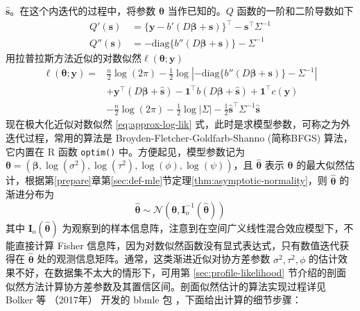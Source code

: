 \documentclass[12pt,a4paper,UTF8,twoside]{book}
\theoremstyle{definition}
\theoremstyle{definition}
\theoremstyle{definition}
\theoremstyle{remark}
\begin{document}
\(\hat{\mathbf{s}}\)。在这个内迭代的过程中，将参数
\(\boldsymbol{\theta}\) 当作已知的。\(Q\) 函数的一阶和二阶导数如下
\begin{align}
Q'(\mathbf{s})& =  \{\mathbf{y} - b'(D\boldsymbol{\beta} + \mathbf{s}) \}^{\top} - \mathbf{s}^{\top}\Sigma^{-1} \label{eq:first-deriv} \\
Q''(\mathbf{s})& =  -\mathrm{diag} \{b''(D\boldsymbol{\beta} + \mathbf{s}) \} - \Sigma^{-1} \label{eq:second-deriv}
\end{align}
\noindent 用拉普拉斯方法近似的对数似然\(\ell(\boldsymbol{\theta};\mathbf{y})\)
\begin{equation}
\begin{aligned}
\ell(\boldsymbol{\theta};\mathbf{y}) = {} & \frac{n}{2}\log (2\pi) -\frac{1}{2}\log | -\mathrm{diag} \{b''(D\boldsymbol{\beta} + \mathbf{s}) \} - \Sigma^{-1} |  \\
& + \mathbf{y}^{\top} (D\boldsymbol{\beta} + \hat{\mathbf{s}}) - \mathbf{1}^{\top} b( D\boldsymbol{\beta} + \hat{\mathbf{s}}) + \mathbf{1}^{\top} c(\mathbf{y}) \\
& - \frac{n}{2}\log (2\pi) -\frac{1}{2}\log |\Sigma| -\frac{1}{2}\hat{\mathbf{s}}^{\top} \Sigma^{-1} \hat{\mathbf{s}}
\end{aligned} \label{eq:approx-log-lik}
\end{equation} \noindent 现在极大化近似对数似然 \eqref{eq:approx-log-lik}
式，此时是求模型参数，可称之为外迭代过程，常用的算法是
Broyden-Fletcher-Goldfarb-Shanno (简称BFGS) 算法，它内置在 R 函数
\texttt{optim()} 中。方便起见，模型参数记为
\(\boldsymbol{\theta} = (\boldsymbol{\beta},\log(\sigma^2),\log(\tau^2),\log(\phi),\log(\psi))\)，且
\(\hat{\boldsymbol{\theta}}\) 表示 \(\boldsymbol{\theta}\)
的最大似然估计，根据第\ref{prepare}章第\ref{sec:def-mle}节定理\ref{thm:asymptotic-normality}，则
\(\hat{\boldsymbol{\theta}}\) 的渐进分布为
\[ \hat{\boldsymbol{\theta}} \sim \mathcal{N}(\boldsymbol{\theta}, \mathbf{I}_{o}^{-1}(\hat{\boldsymbol{\theta}})) \]
\noindent 其中 \(\mathbf{I}_{o}(\hat{\boldsymbol{\theta}})\)
为观察到的样本信息阵，注意到在空间广义线性混合效应模型下，不能直接计算
Fisher 信息阵，因为对数似然函数没有显式表达式，只有数值迭代获得在
\(\hat{\boldsymbol{\theta}}\)
处的观测信息矩阵。通常，这类渐进近似对协方差参数
\(\sigma^2, \tau^2, \phi\)
的估计效果不好，在数据集不太大的情形下，可用第
\ref{sec:profile-likelihood}
节介绍的剖面似然方法计算协方差参数及其置信区间。剖面似然估计的算法实现过程详见
Bolker 等 （2017年） 开发的 bbmle 包
\citep{R-bbmle}，下面给出计算的细节步骤：
\end{document}
